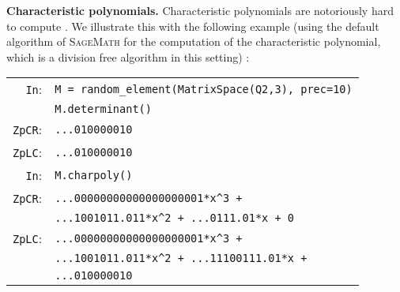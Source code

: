 \documentclass[sigconf]{acmart}
\newcommand{\sage}{\textsc{SageMath}\xspace}
\newcommand{\cIn}{{\color{input} \tt \phantom{Zp}In}:}
\newcommand{\cZpCR}{{\color{output} \tt ZpCR}:}
\newcommand{\cZpFP}{{\color{output} \tt ZpFP}:}
\newcommand{\cZpLC}{{\color{output} \tt ZpLC}:}
\newcommand{\cZpLF}{{\color{output} \tt ZpLF}:}
\theoremstyle{definition}
\begin{document}
\medskip

\noindent \textbf{Characteristic polynomials.}
%
Characteristic polynomials are notoriously hard to compute 
\cite{caruso-roe-vaccon:15, caruso-roe-vaccon:17}. We illustrate this 
with the following example (using the default algorithm of \sage for the 
computation of the characteristic polynomial, which is a division free 
algorithm in this setting) :

\smallskip

{\noindent \small
\begin{tabular}{rl}
\cIn
 & \verb?M = ?{\color{function}\verb?random_element?}\verb?(?{\color{constructor}\verb?MatrixSpace?}\verb?(?{\color{ring}\verb?Q2?}\verb?,3), prec=10)? \\
 & \verb?M.?{\color{method}\verb?determinant?}\verb?()? \\
\cZpCR
 & \verb?...010000010? \\
\cZpLC
 & \verb?...010000010? \\
\cIn
 & \verb?M.?{\color{method}\verb?charpoly?}\verb?()? \\
\cZpCR
 & \verb?...00000000000000000001*x^3 + ? \\
 & \verb?...1001011.011*x^2 + ...0111.01*x + 0? \\
\cZpLC
 & \verb?...00000000000000000001*x^3 + ? \\
 & \verb?...1001011.011*x^2 + ...11100111.01*x +? \\
 & \verb?...010000010? \\
\end{tabular}}

\end{document}

